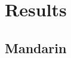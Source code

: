\section{Results}
\label{sec:scaling_asr:results}

\subsection{Mandarin}
\label{sec:scaling_asr:results_mandarin}
